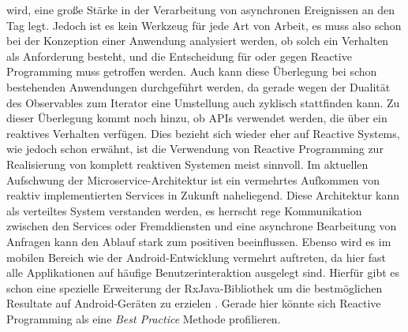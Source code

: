 wird, eine große Stärke in der Verarbeitung von asynchronen Ereignissen an den Tag legt. Jedoch ist es kein Werkzeug für jede Art von Arbeit, es muss also schon bei der Konzeption einer Anwendung analysiert werden, ob solch ein Verhalten als Anforderung besteht, und die Entscheidung für oder gegen Reactive Programming muss getroffen werden. Auch kann diese Überlegung bei schon bestehenden Anwendungen durchgeführt werden, da gerade wegen der Dualität des Observables zum Iterator eine Umstellung auch zyklisch stattfinden kann. Zu dieser Überlegung kommt noch hinzu, ob APIs verwendet werden, die über ein reaktives Verhalten verfügen. Dies bezieht sich wieder eher auf Reactive Systems, wie jedoch schon erwähnt, ist die Verwendung von Reactive Programming zur Realisierung von komplett reaktiven Systemen meist sinnvoll. Im aktuellen Aufschwung der Microservice-Architektur ist ein vermehrtes Aufkommen von reaktiv implementierten Services in Zukunft naheliegend. Diese Architektur kann als verteiltes System verstanden werden, es herrscht rege Kommunikation zwischen den Services oder Fremddiensten und eine asynchrone Bearbeitung von Anfragen kann den Ablauf stark zum positiven beeinflussen. Ebenso wird es im mobilen Bereich wie der Android-Entwicklung vermehrt auftreten, da hier fast alle Applikationen auf häufige Benutzerinteraktion ausgelegt sind. Hierfür gibt es schon eine spezielle Erweiterung der RxJava-Bibliothek um die bestmöglichen Resultate auf Android-Geräten zu erzielen \cite{android}. Gerade hier könnte sich Reactive Programming als eine \textit{Best Practice} Methode profilieren.
